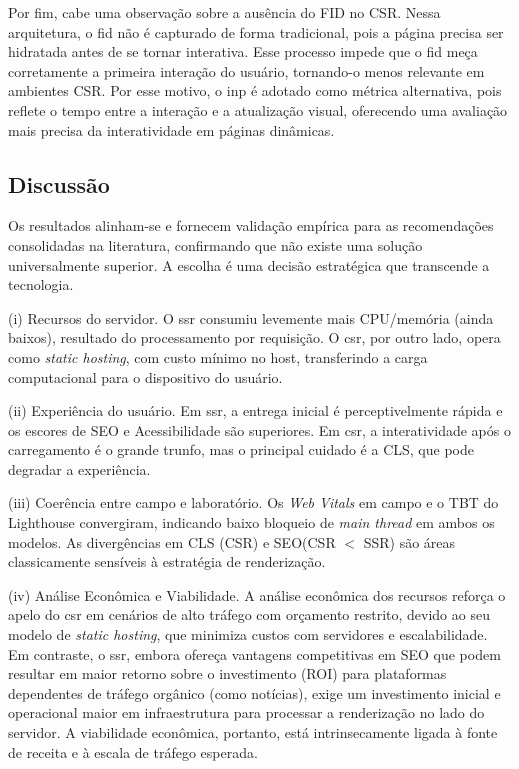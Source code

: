 {Por fim, cabe uma observação sobre a ausência do FID no CSR. Nessa arquitetura, o \acrfull{fid} não é capturado de forma tradicional, pois a página precisa ser hidratada antes de se tornar interativa. Esse processo impede que o \acrshort{fid} meça corretamente a primeira interação do usuário, tornando-o menos relevante em ambientes CSR. Por esse motivo, o \acrfull{inp} é adotado como métrica alternativa, pois reflete o tempo entre a interação e a atualização visual, oferecendo uma avaliação mais precisa da interatividade em páginas dinâmicas.


\subsection{Discussão}
\label{subsec:discussao-comparativa}
Os resultados alinham-se e fornecem validação empírica para as recomendações consolidadas na literatura, confirmando que não existe uma solução universalmente superior. A escolha é uma decisão estratégica que transcende a tecnologia.

(i) Recursos do servidor. O \acrshort{ssr} consumiu levemente mais CPU/memória (ainda baixos), resultado do processamento por requisição. O \acrshort{csr}, por outro lado, opera como \emph{static hosting}, com custo mínimo no host, transferindo a carga computacional para o dispositivo do usuário.

(ii) Experiência do usuário. Em \acrshort{ssr}, a entrega inicial é perceptivelmente rápida e os escores de SEO e Acessibilidade são superiores. Em \acrshort{csr}, a interatividade após o carregamento é o grande trunfo, mas o principal cuidado é a CLS, que pode degradar a experiência.

(iii) Coerência entre campo e laboratório. Os \textit{Web Vitals} em campo e o TBT do Lighthouse convergiram, indicando baixo bloqueio de \emph{main thread} em ambos os modelos. As divergências em CLS (CSR) e SEO(CSR $<$ SSR) são áreas classicamente sensíveis à estratégia de renderização.

(iv) Análise Econômica e Viabilidade. A análise econômica dos recursos reforça o apelo do \acrshort{csr} em cenários de alto tráfego com orçamento restrito, devido ao seu modelo de \emph{static hosting}, que minimiza custos com servidores e escalabilidade. Em contraste, o \acrshort{ssr}, embora ofereça vantagens competitivas em SEO que podem resultar em maior retorno sobre o investimento (ROI) para plataformas dependentes de tráfego orgânico (como notícias), exige um investimento inicial e operacional maior em infraestrutura para processar a renderização no lado do servidor. A viabilidade econômica, portanto, está intrinsecamente ligada à fonte de receita e à escala de tráfego esperada.

}
